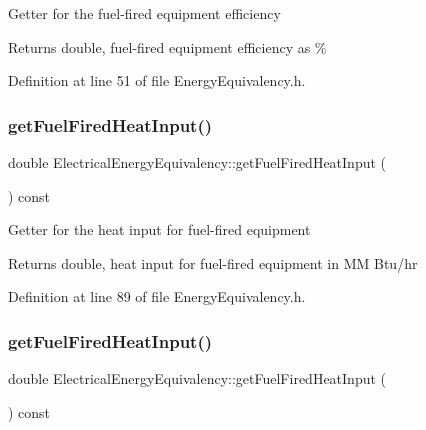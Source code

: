 Getter for the fuel-\/fired equipment efficiency

\begin{DoxyReturn}{Returns}
double, fuel-\/fired equipment efficiency as \% 
\end{DoxyReturn}


Definition at line 51 of file Energy\+Equivalency.\+h.

\mbox{\label{class_electrical_energy_equivalency_acb07f4cd7d416922bc355b2f1b3aadb4}} 
\subsubsection{\texorpdfstring{get\+Fuel\+Fired\+Heat\+Input()}{getFuelFiredHeatInput()}\hspace{0.1cm}{\footnotesize\ttfamily [1/3]}}
{\footnotesize\ttfamily double Electrical\+Energy\+Equivalency\+::get\+Fuel\+Fired\+Heat\+Input (\begin{DoxyParamCaption}{ }\end{DoxyParamCaption}) const\hspace{0.3cm}{\ttfamily [inline]}}

Getter for the heat input for fuel-\/fired equipment

\begin{DoxyReturn}{Returns}
double, heat input for fuel-\/fired equipment in MM Btu/hr 
\end{DoxyReturn}


Definition at line 89 of file Energy\+Equivalency.\+h.

\mbox{\label{class_electrical_energy_equivalency_acb07f4cd7d416922bc355b2f1b3aadb4}} 
\subsubsection{\texorpdfstring{get\+Fuel\+Fired\+Heat\+Input()}{getFuelFiredHeatInput()}\hspace{0.1cm}{\footnotesize\ttfamily [2/3]}}
{\footnotesize\ttfamily double Electrical\+Energy\+Equivalency\+::get\+Fuel\+Fired\+Heat\+Input (\begin{DoxyParamCaption}{ }\end{DoxyParamCaption}) const\hspace{0.3cm}{\ttfamily [inline]}}


